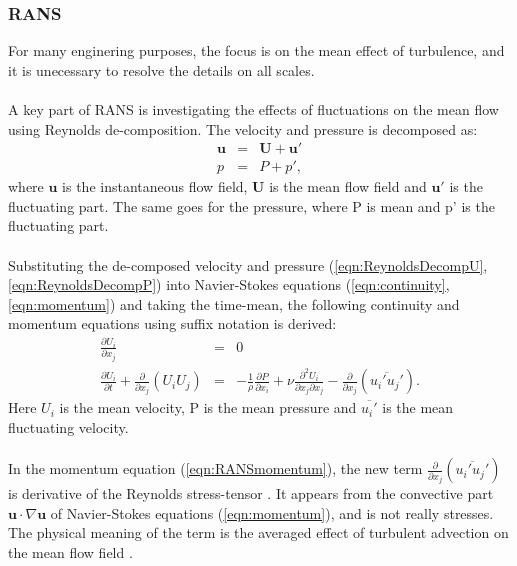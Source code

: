 \documentclass[a4paper, 12pt]{report}
\begin{document}
\subsubsection{RANS}
For many enginering purposes, the focus is on the mean effect of turbulence, and it is unecessary to resolve the details on all scales.\\
\\
A key part of RANS is investigating the effects of fluctuations on the mean flow using Reynolds de-composition. The velocity and pressure is decomposed as:
\begin{eqnarray}
\label{eqn:ReynoldsDecompU}
\mathbf{u} &=& \mathbf{U} + \mathbf{u'} \\
\label{eqn:ReynoldsDecompP}
p &=& P + p',
\end{eqnarray}
where $\mathbf{u}$ is the instantaneous flow field, $\mathbf{U}$ is the mean flow field and $\mathbf{u'}$ is the fluctuating part. The same goes for the pressure, where P is mean and p' is the fluctuating part.\\
\\
Substituting the de-composed velocity and pressure (\ref{eqn:ReynoldsDecompU}, \ref{eqn:ReynoldsDecompP}) into Navier-Stokes equations (\ref{eqn:continuity}, \ref{eqn:momentum}) and taking the time-mean, the following continuity and momentum equations using suffix notation is derived:
\begin{eqnarray}
\label{eqn:RANScontinuity}
\frac{\partial U_i}{\partial x_j}  &=& 0 \\
\label{eqn:RANSmomentum}
\frac{\partial U_i}{\partial t} +  \frac{\partial}{\partial x_j}(U_i U_j) &=& -\frac{1}{\rho} \frac{\partial P}{\partial x_i} + \nu \frac{\partial ^2 U_i}{\partial x_j \partial x_j} - \frac{\partial}{\partial x_j} (\overline {u_i' u_j'}).
\end{eqnarray}
Here $U_i$ is the mean velocity, P is the mean pressure and $\overline{u_i'}$ is the mean fluctuating velocity.\\
\\
In the momentum equation (\ref{eqn:RANSmomentum}), the new term $\frac{\partial }{\partial x_j}(\overline{u_i'u_j'})$ is derivative of the Reynolds stress-tensor \citep{UNIK4900}. It appears from the convective part $ \mathbf{u} \cdot \nabla \mathbf{u}$ of Navier-Stokes equations (\ref{eqn:momentum}), and is not really stresses. The physical meaning of the term is the averaged effect of turbulent advection on the mean flow field \cite{UNIK4900}.\\
\\
\end{document}
